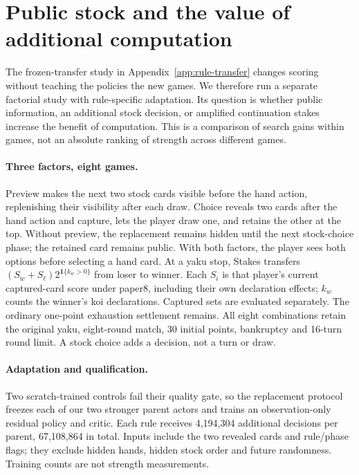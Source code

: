 \section{Public stock and the value of additional computation}
\label{app:public-stock}
The frozen-transfer study in Appendix~\ref{app:rule-transfer} changes scoring
without teaching the policies the new games. We therefore run a separate
factorial study with rule-specific adaptation. Its question is whether public
information, an additional stock decision, or amplified continuation stakes
increase the benefit of computation. This is a comparison of search gains
within games, not an absolute ranking of strength across different games.

\paragraph{Three factors, eight games.}
Preview makes the next two stock cards visible before the hand action,
replenishing their visibility after each draw. Choice reveals two cards after
the hand action and capture, lets the player draw one, and retains the other
at the top. Without preview, the replacement remains hidden until the next
stock-choice phase; the retained card remains public. With both factors,
the player sees both options before selecting a hand card. At a yaku stop,
Stakes transfers $(S_w+S_\ell)2^{\mathbf{1}\{k_w>0\}}$ from loser to winner.
Each $S_i$ is that player's current captured-card score under paper8,
including their own declaration effects; $k_w$ counts the winner's
koi declarations. Captured sets are evaluated separately. The ordinary
one-point exhaustion settlement remains. All eight combinations retain the
original yaku, eight-round match, 30 initial points, bankruptcy and 16-turn round limit. A stock choice
adds a decision, not a turn or draw.

\paragraph{Adaptation and qualification.}
Two scratch-trained controls fail their quality gate, so the replacement
protocol freezes each of our two stronger parent actors and trains an
observation-only residual policy and critic. Each rule receives 4,194,304
additional decisions per parent, 67,108,864 in total. Inputs include the two
revealed cards and rule/phase flags; they exclude hidden hands, hidden stock
order and future randomness. Training counts are not strength measurements.

